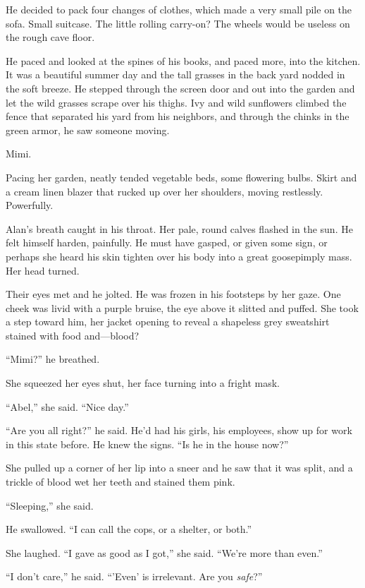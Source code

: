 \documentclass{article}
\begin{document}
He decided to pack four changes of clothes, which made a very small
pile on the sofa.  Small suitcase.  The little rolling carry-on?  The
wheels would be useless on the rough cave floor.

He paced and looked at the spines of his books, and paced more, into
the kitchen.  It was a beautiful summer day and the tall grasses in
the back yard nodded in the soft breeze.  He stepped through the
screen door and out into the garden and let the wild grasses scrape
over his thighs.  Ivy and wild sunflowers climbed the fence that
separated his yard from his neighbors, and through the chinks in the
green armor, he saw someone moving.

Mimi.

Pacing her garden, neatly tended vegetable beds, some flowering bulbs. 
Skirt and a cream linen blazer that rucked up over her shoulders,
moving restlessly.  Powerfully.

Alan's breath caught in his throat.  Her pale, round calves flashed in
the sun.  He felt himself harden, painfully.  He must have gasped, or
given some sign, or perhaps she heard his skin tighten over his body
into a great goosepimply mass.  Her head turned.

Their eyes met and he jolted.  He was frozen in his footsteps by her
gaze.  One cheek was livid with a purple bruise, the eye above it
slitted and puffed.  She took a step toward him, her jacket opening to
reveal a shapeless grey sweatshirt stained with food and---blood?

``Mimi?'' he breathed.

She squeezed her eyes shut, her face turning into a fright mask.

``Abel,'' she said.  ``Nice day.''

``Are you all right?'' he said.  He'd had his girls, his employees,
show up for work in this state before.  He knew the signs.  ``Is he in
the house now?''

She pulled up a corner of her lip into a sneer and he saw that it was
split, and a trickle of blood wet her teeth and stained them pink.

``Sleeping,'' she said.

He swallowed.  ``I can call the cops, or a shelter, or both.''

She laughed.  ``I gave as good as I got,'' she said.  ``We're more
than even.''

``I don't care,'' he said.  ``'Even' is irrelevant.  Are you
\textit{safe}?''
\end{document}
